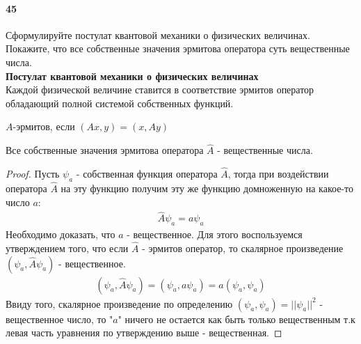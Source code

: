 



\paragraph{45}
Сформулируйте постулат квантовой механики о физических величинах. Покажите, что все собственные значения эрмитова оператора суть вещественные числа.\\

\textbf{Постулат квантовой механики о физических величинах}\\
Каждой физической величине ставится в соответствие эрмитов оператор обладающий полной системой собственных функций.
\begin{definition}
$A$-эрмитов, если $(Ax,y)=(x,Ay)$	
\end{definition}

\begin{statement}
	Все собственные значения эрмитова оператора $\hat{A}$ - вещественные числа.
\end{statement}
\begin{proof}
	Пусть $\psi_a$ - собственная функция оператора $\hat{A}$, тогда при воздействии оператора $\hat{A}$ на эту функцию получим эту же функцию домноженную на какое-то число $a$:
	\begin{gather*}
		\hat{A}\psi_a = a\psi_a
	\end{gather*}
	Необходимо доказать, что $a$ - вещественное. Для этого воспользуемся утверждением того, что если $\hat{A}$ - эрмитов оператор, то скалярное произведение $(\psi_a,\hat{A}\psi_a)$ - вещественное.
	\begin{gather*}
		(\psi_a,\hat{A}\psi_a) = (\psi_a,a\psi_a) = a(\psi_a,\psi_a)
	\end{gather*}
	Ввиду того, скалярное произведение по определению $(\psi_a,\psi_a) = \vert\vert\psi_a\vert\vert^2$ - вещественное число, то "$a$" ничего не остается как быть только вещественным т.к левая часть уравнения по утверждению выше  - вещественная.
\end{proof}
